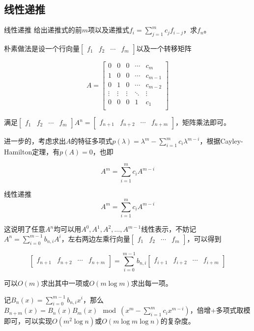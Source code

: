 \documentclass{beamer}
\begin{document}
	\subsection{线性递推}
	\begin{frame}{线性递推}
		给出递推式的前$m$项以及递推式$f_i=\sum\limits_{j=1}^mc_jf_{i-j}$，求$f_n$。
		
		朴素做法是设一个行向量$\begin{bmatrix}f_1 & f_2 & \cdots & f_m\end{bmatrix}$以及一个转移矩阵
		
		$$A=\begin{bmatrix}
		0 & 0 & 0 & \cdots & c_m\\
		1 & 0 & 0 & \cdots & c_{m-1}\\
		0 & 1 & 0 & \cdots & c_{m-2}\\
		\vdots & \vdots  & \vdots & \ddots & \vdots \\
		0 & 0 & 0 & 1 & c_1\\
		\end{bmatrix}$$
		
		满足$\begin{bmatrix}f_1 & f_2 & \cdots & f_m\end{bmatrix} A^n = \begin{bmatrix}f_{n+1} & f_{n+2} & \cdots & f_{n+m}\end{bmatrix}$，矩阵乘法即可。
		
		进一步的，考虑求出$A$的特征多项式$p(\lambda)=\lambda^m-\sum\limits_{i=1}^mc_i\lambda^{m-i}$，根据Cayley-Hamilton定理，有$p(A)=0$，也即
		
		$$A^m=\sum_{i=1}^mc_iA^{m-i}$$
		
	\end{frame}
	\begin{frame}{线性递推}
		$$A^m=\sum_{i=1}^mc_iA^{m-i}$$
		
		这说明了任意$A^n$均可以用$A^0,A^1,A^2,...,A^{m-1}$线性表示，不妨记$A^n=\sum\limits_{i=0}^{m-1}b_{n,i}A^i$，左右两边左乘行向量$\begin{bmatrix}f_1 & f_2 & \cdots & f_m\end{bmatrix}$，可以得到
		
		$$\begin{bmatrix}f_{n+1} & f_{n+2} & \cdots & f_{n+m}\end{bmatrix}=\sum_{i=0}^{m-1}b_{n,i}\begin{bmatrix}f_{i+1} & f_{i+2} & \cdots & f_{i+m}\end{bmatrix}$$
		
		可以$O(m)$求出其中一项或$O(m\log m)$求出每一项。
		
		记$B_n(x)=\sum\limits_{i=0}^{m-1}b_{n,i}x^i$，那么$B_{n+m}(x)=B_n(x)B_m(x) \mod (x^m-\sum\limits_{i=1}^mc_ix^{m-i})$，倍增+多项式取模即可，可以实现$O(m^2\log n)$或$O(m\log m\log n)$的复杂度。
		
	\end{frame}
\end{document}
